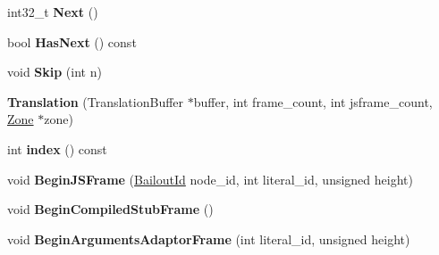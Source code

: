 \begin{DoxyCompactItemize}
\item 
\hypertarget{classv8_1_1internal_1_1_b_a_s_e___e_m_b_e_d_d_e_d_a4ecc6394f92c4ed61a338b619db3bca0}{}int32\+\_\+t {\bfseries Next} ()\label{classv8_1_1internal_1_1_b_a_s_e___e_m_b_e_d_d_e_d_a4ecc6394f92c4ed61a338b619db3bca0}

\item 
\hypertarget{classv8_1_1internal_1_1_b_a_s_e___e_m_b_e_d_d_e_d_ac0b29094eb9052e601792fa67b0e3751}{}bool {\bfseries Has\+Next} () const \label{classv8_1_1internal_1_1_b_a_s_e___e_m_b_e_d_d_e_d_ac0b29094eb9052e601792fa67b0e3751}

\item 
\hypertarget{classv8_1_1internal_1_1_b_a_s_e___e_m_b_e_d_d_e_d_a778cf7d9b2915e845667b0044bfd4b7b}{}void {\bfseries Skip} (int n)\label{classv8_1_1internal_1_1_b_a_s_e___e_m_b_e_d_d_e_d_a778cf7d9b2915e845667b0044bfd4b7b}

\item 
\hypertarget{classv8_1_1internal_1_1_b_a_s_e___e_m_b_e_d_d_e_d_aa23f0aba8f5f7d1d02a966ca89f8f655}{}{\bfseries Translation} (Translation\+Buffer $\ast$buffer, int frame\+\_\+count, int jsframe\+\_\+count, \hyperlink{classv8_1_1internal_1_1_zone}{Zone} $\ast$zone)\label{classv8_1_1internal_1_1_b_a_s_e___e_m_b_e_d_d_e_d_aa23f0aba8f5f7d1d02a966ca89f8f655}

\item 
\hypertarget{classv8_1_1internal_1_1_b_a_s_e___e_m_b_e_d_d_e_d_a96c5297cf77a89dca171ef93fcd51b01}{}int {\bfseries index} () const \label{classv8_1_1internal_1_1_b_a_s_e___e_m_b_e_d_d_e_d_a96c5297cf77a89dca171ef93fcd51b01}

\item 
\hypertarget{classv8_1_1internal_1_1_b_a_s_e___e_m_b_e_d_d_e_d_a63340bacc1bfd6cbce41f50ce27a4f82}{}void {\bfseries Begin\+J\+S\+Frame} (\hyperlink{classv8_1_1internal_1_1_bailout_id}{Bailout\+Id} node\+\_\+id, int literal\+\_\+id, unsigned height)\label{classv8_1_1internal_1_1_b_a_s_e___e_m_b_e_d_d_e_d_a63340bacc1bfd6cbce41f50ce27a4f82}

\item 
\hypertarget{classv8_1_1internal_1_1_b_a_s_e___e_m_b_e_d_d_e_d_a084d85aaeb59bfe3e57387b56433a979}{}void {\bfseries Begin\+Compiled\+Stub\+Frame} ()\label{classv8_1_1internal_1_1_b_a_s_e___e_m_b_e_d_d_e_d_a084d85aaeb59bfe3e57387b56433a979}

\item 
\hypertarget{classv8_1_1internal_1_1_b_a_s_e___e_m_b_e_d_d_e_d_a5753ee466fe480fd15a5660dbf67c586}{}void {\bfseries Begin\+Arguments\+Adaptor\+Frame} (int literal\+\_\+id, unsigned height)\label{classv8_1_1internal_1_1_b_a_s_e___e_m_b_e_d_d_e_d_a5753ee466fe480fd15a5660dbf67c586}


\end{DoxyCompactItemize}
